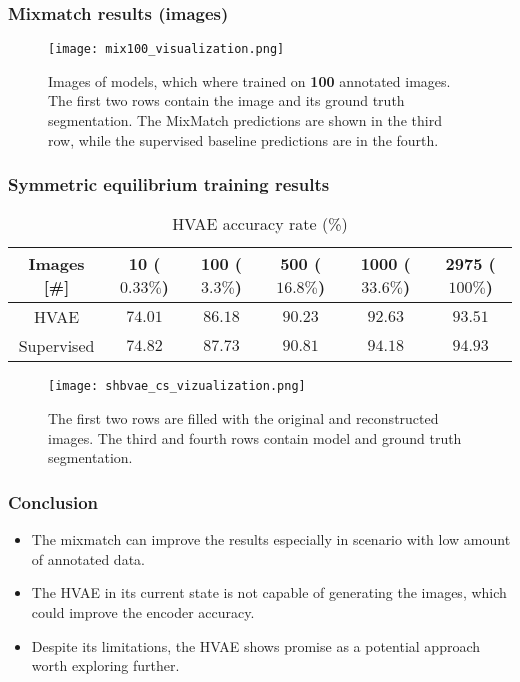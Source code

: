 \documentclass[aspectratio=169]{beamer}
\begin{document}
\begin{frame}
    \frametitle{Mixmatch results (images)}
    \begin{figure}[t]
        \centering
        \texttt{[image: mix100\_visualization.png]}
        \caption{Images of models, which where trained on \textbf{100} annotated images. The first two rows contain the image and its ground truth segmentation. The MixMatch predictions are shown in the third row, 
        while the supervised baseline predictions are in the fourth.}
    \end{figure}
\end{frame}

\begin{frame}
    \frametitle{Symmetric equilibrium training results}
    \begin{table}[tbh]
        \begin{tabular}{|c|c|c|c|c|c|}
        \hline
        Images [\#]  & 10 ($0.33\%$) & 100 ($3.3\%$) & 500 ($16.8\%$) & 1000 ($33.6\%$)& 2975 ($100\%$) \\
        \hline
        HVAE & $74.01$ & $86.18$ & $90.23$ & $92.63$ & $93.51$ \\
        \hline
        Supervised & $74.82$ & $87.73$ & $90.81$ &$94.18$& $94.93$ \\
        \hline
        \end{tabular}
        \caption[HVAE plain accuracy on CityScape]{HVAE accuracy rate (\%) }
        \label{tab:hvae-cityscapes-acc}
    \end{table}
    
    \begin{figure}[t]
        \centering
        \texttt{[image: shbvae\_cs\_vizualization.png]}
        \caption[Symmetric learning HVAE CityScape results]{The first two rows are filled with the original and reconstructed
        images. The third and fourth rows contain model and ground truth segmentation.}
        \label{fig:hvae-cs}
    \end{figure}
\end{frame}

\begin{frame}
    \frametitle{Conclusion}
    \begin{itemize}
        \item The mixmatch can improve the results especially in scenario with low amount of annotated data.
        \item The HVAE in its current state is not capable of generating the images, which could improve the encoder accuracy.
        \item Despite its limitations, the HVAE shows promise as a potential approach worth exploring further.
    
    \end{itemize}
\end{frame}
\end{document}

